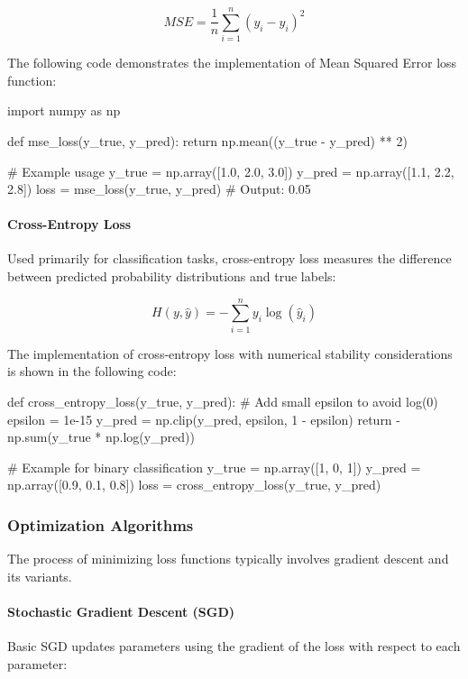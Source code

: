 \[ MSE = \frac{1}{n}\sum_{i=1}^n (y_i - \hat{y}_i)^2 \]

The following code demonstrates the implementation of Mean Squared Error loss function:

\begin{pythoncode}
import numpy as np

def mse_loss(y_true, y_pred):
    return np.mean((y_true - y_pred) ** 2)

# Example usage
y_true = np.array([1.0, 2.0, 3.0])
y_pred = np.array([1.1, 2.2, 2.8])
loss = mse_loss(y_true, y_pred)  # Output: 0.05
\end{pythoncode}



\paragraph{Cross-Entropy Loss}
Used primarily for classification tasks, cross-entropy loss measures the difference between predicted probability distributions and true labels:

\[ H(y, \hat{y}) = -\sum_{i=1}^n y_i \log(\hat{y}_i) \]

The implementation of cross-entropy loss with numerical stability considerations is shown in the following code:

\begin{pythoncode}
def cross_entropy_loss(y_true, y_pred):
    # Add small epsilon to avoid log(0)
    epsilon = 1e-15
    y_pred = np.clip(y_pred, epsilon, 1 - epsilon)
    return -np.sum(y_true * np.log(y_pred))

# Example for binary classification
y_true = np.array([1, 0, 1])
y_pred = np.array([0.9, 0.1, 0.8])
loss = cross_entropy_loss(y_true, y_pred)
\end{pythoncode}

\subsubsection{Optimization Algorithms}
The process of minimizing loss functions typically involves gradient descent and its variants.

\paragraph{Stochastic Gradient Descent (SGD)}
Basic SGD updates parameters using the gradient of the loss with respect to each parameter:


